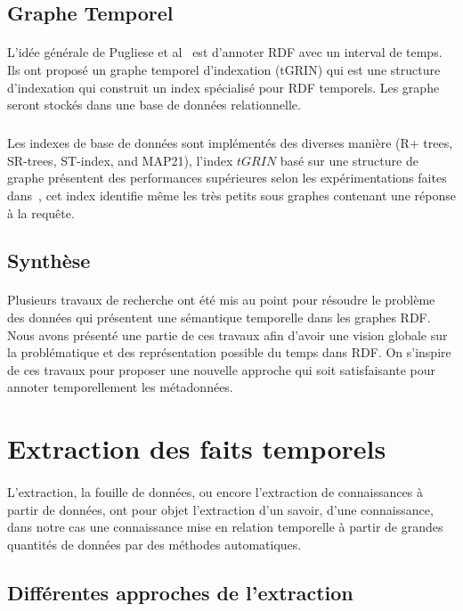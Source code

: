 \documentclass[12pt,a4]{report}
\begin{document}
\subsection{Graphe Temporel}
\paragraph{}
L'idée générale de Pugliese et al~\cite{pugliese2008} est d'annoter RDF avec un interval de temps.
Ils ont proposé un graphe temporel d'indexation (tGRIN) qui est une structure d’indexation qui construit un index spécialisé pour RDF temporels. Les graphe seront stockés dans une base de données relationnelle.
\subparagraph{}
Les indexes de base de données sont implémentés des diverses manière (R+ trees, SR-trees, ST-index, and MAP21), l'index $tGRIN$ basé sur une structure de graphe présentent des performances supérieures selon les expérimentations faites dans~\cite{pugliese2008}, cet index identifie même les très petits sous graphes contenant une réponse à la requête.
\subsection{Synthèse}
\paragraph{}
Plusieurs travaux de recherche ont été mis au point pour résoudre le problème des données qui présentent une sémantique temporelle dans les graphes RDF. Nous avons présenté une partie de ces travaux afin d'avoir une vision globale sur la problématique et des représentation possible du temps dans RDF. On s'inspire de ces travaux pour proposer une nouvelle approche qui soit satisfaisante pour annoter temporellement les métadonnées.
\newpage
\section{Extraction des faits temporels}
\paragraph{}
L'extraction, la fouille de données, ou encore l'extraction de connaissances à partir de données, ont pour objet l'extraction d'un savoir, d'une connaissance, dans notre cas une connaissance mise en relation temporelle à partir de grandes quantités de données par des méthodes automatiques.
\subsection{Différentes approches de l'extraction }
\end{document}
